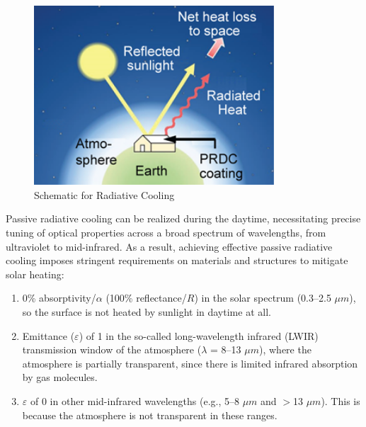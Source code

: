\begin{figure}
  \centering
  \includegraphics[width=0.8\textwidth]{Chapters/Figures/Schematic for Radiative Cooling.png}
  \caption{Schematic for Radiative Cooling}
\end{figure}

Passive radiative cooling can be realized during the daytime, necessitating precise tuning of optical properties across a broad spectrum of wavelengths, from ultraviolet to mid-infrared. As a result, achieving effective passive radiative cooling imposes stringent requirements on materials and structures to mitigate solar heating:

\begin{enumerate}
\item 0\% absorptivity/$\alpha$ (100\% reflectance/$R$) in the solar spectrum (0.3–2.5 $\mu m$), so the surface is not heated by sunlight in daytime at all.
\item Emittance ($\varepsilon$) of 1 in the so-called long-wavelength infrared (LWIR) transmission window of the atmosphere ($\lambda$ = 8–13 $\mu m$), where the atmosphere is partially transparent, since there is limited infrared absorption by gas molecules.
\item $\varepsilon$ of 0 in other mid-infrared wavelengths (e.g., 5–8 $\mu m$ and $>$13 $\mu m$). This is because the atmosphere is not transparent in these ranges.
\end{enumerate}

